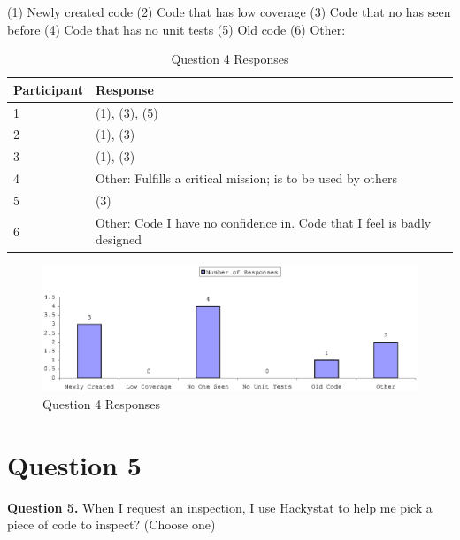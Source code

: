 (1) Newly created code \newline
\indent (2) Code that has low coverage \newline
\indent (3) Code that no has seen before \newline
\indent (4) Code that has no unit tests \newline
\indent (5) Old code \newline
\indent (6) Other: \newline

\begin{table}[!h]
  \begin{center}
    \caption{Question 4 Responses}
    \label{tab:pre-selection-questionnaire-results-4}
    \begin{tabular}{|p{3.0cm}|p{10.0cm}|} \hline
{\bf Participant} & {\bf Response} \\ \hline
1 & (1), (3), (5) \\ \hline
2 & (1), (3) \\ \hline
3 & (1), (3) \\ \hline
4 & Other: Fulfills a critical mission; is to be used by others \\ \hline
5 & (3) \\ \hline
6 & Other: Code I have no confidence in. Code that I feel is badly designed 
\\ \hline
    \end{tabular}
  \end{center}
\end{table}

\begin{figure}[htb]
  \centering
  \includegraphics[width=1.0\textwidth]{figs/Results/pre-selection-questionnaire-4.eps}
  \caption{Question 4 Responses}
  \label{fig:pre-selection-questionnaire-results-4}
\end{figure}


\clearpage
\section{Question 5}
\label{appendix:section:question5}
\noindent \textbf{Question 5.} When I request an inspection, I use
Hackystat to help me pick a piece of code to inspect? (Choose one)

